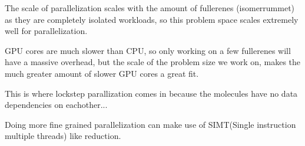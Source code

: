 The scale of parallelization scales with the amount of fullerenes (isomerrummet) as they are completely isolated workloads, so this problem space scales extremely well for parallelization.


GPU cores are much slower than CPU, so only working on a few fullerenes will have a massive overhead, but the scale of the problem size we work on, makes the much greater amount of slower GPU cores a great fit.

This is where lockstep parallization comes in because the molecules have no data dependencies on eachother...

Doing more fine grained parallelization can make use of SIMT(Single instruction multiple threads) like reduction.
